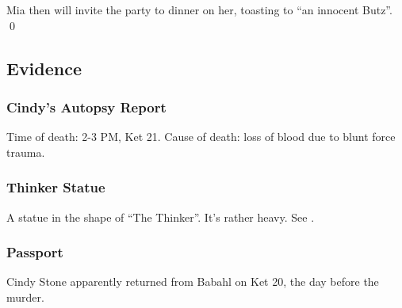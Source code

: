 Mia then will invite the party to dinner on her, toasting to ``an innocent Butz''.
\qed

\subsection{Evidence}
\subsubsection{Cindy's Autopsy Report}
\label{evidence:cindyautopsy}
Time of death: 2-3 PM, Ket 21. Cause of death: loss of blood due to blunt force trauma. 


\subsubsection{Thinker Statue}
\label{evidence:thinker}
A statue in the shape of ``The Thinker''. It's rather heavy. See .

\subsubsection{Passport}
\label{evidence:passport}
Cindy Stone apparently returned from Babahl on Ket 20, the day before the murder. 